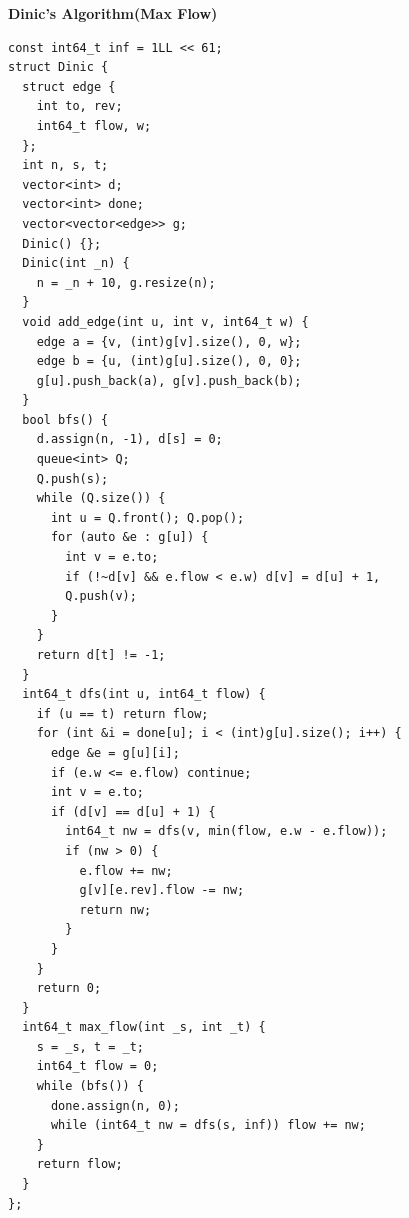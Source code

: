 \textbf{Dinic's Algorithm(Max Flow)}
\begin{lstlisting}
const int64_t inf = 1LL << 61;
struct Dinic {
  struct edge {
    int to, rev;
    int64_t flow, w;
  };
  int n, s, t;
  vector<int> d;
  vector<int> done;
  vector<vector<edge>> g;
  Dinic() {};
  Dinic(int _n) {
    n = _n + 10, g.resize(n);
  }
  void add_edge(int u, int v, int64_t w) {
    edge a = {v, (int)g[v].size(), 0, w};
    edge b = {u, (int)g[u].size(), 0, 0};
    g[u].push_back(a), g[v].push_back(b);
  }
  bool bfs() {
    d.assign(n, -1), d[s] = 0;
    queue<int> Q;
    Q.push(s);
    while (Q.size()) {
      int u = Q.front(); Q.pop();
      for (auto &e : g[u]) {
        int v = e.to;
        if (!~d[v] && e.flow < e.w) d[v] = d[u] + 1,
        Q.push(v);
      }
    }
    return d[t] != -1;
  }
  int64_t dfs(int u, int64_t flow) {
    if (u == t) return flow;
    for (int &i = done[u]; i < (int)g[u].size(); i++) {
      edge &e = g[u][i];
      if (e.w <= e.flow) continue;
      int v = e.to;
      if (d[v] == d[u] + 1) {
        int64_t nw = dfs(v, min(flow, e.w - e.flow));
        if (nw > 0) {
          e.flow += nw;
          g[v][e.rev].flow -= nw;
          return nw;
        }
      }
    }
    return 0;
  }
  int64_t max_flow(int _s, int _t) {
    s = _s, t = _t;
    int64_t flow = 0;
    while (bfs()) {
      done.assign(n, 0);
      while (int64_t nw = dfs(s, inf)) flow += nw;
    }
    return flow;
  }
};
\end{lstlisting}
